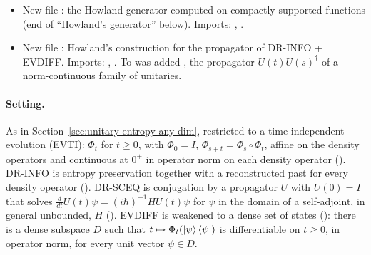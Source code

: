 \documentclass[11pt]{article}
\begin{document}
\begin{itemize}
  ,
   (dominated convergence in $L^p$)
  and TauCeti's  (strong continuity of
  translation in $L^p$).
\item New file : the Howland generator
  computed on compactly supported functions (end of ``Howland's generator'' below). Imports:
  , .
\item New file : Howland's
  construction for the propagator of DR-INFO + EVDIFF. Imports: ,
  . To  was added
  , the propagator $U(t)U(s)^\dagger$ of a norm-continuous
  family of unitaries.
\end{itemize}

\paragraph{Setting.} As in Section~\ref{sec:unitary-entropy-any-dim}, restricted to a
time-independent evolution (EVTI): $\Phi_t$ for $t \ge 0$, with $\Phi_0 = I$,
$\Phi_{s+t} = \Phi_s \circ \Phi_t$, affine on the density operators and continuous at $0^+$ in
operator norm on each density operator (). DR-INFO is entropy preservation
together with a reconstructed past for every density operator (). DR-SCEQ is
conjugation by a propagator $U$ with $U(0) = I$ that solves
$\tfrac{d}{dt}U(t)\psi = (i\hbar)^{-1}HU(t)\psi$ for $\psi$ in the domain of a self-adjoint,
in general unbounded, $H$ (). EVDIFF is weakened to a dense set of states
(): there is a dense subspace $D$ such that $t \mapsto \Phi_t(\ket\psi\bra\psi)$ is
differentiable on $t \ge 0$, in operator norm, for every unit vector $\psi \in D$.
\end{document}
